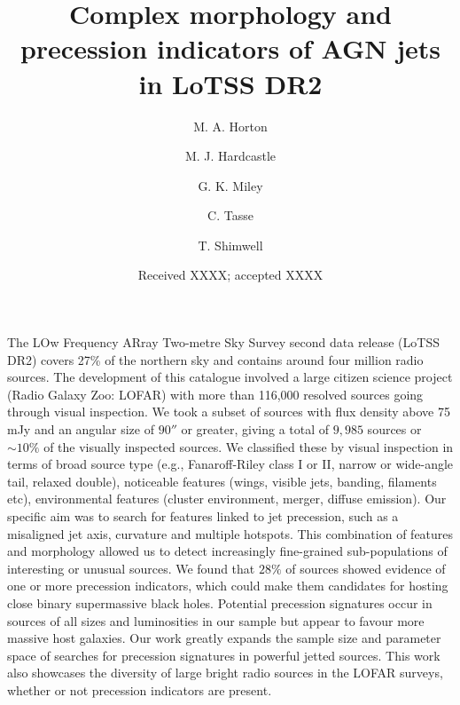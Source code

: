 \documentclass{aa}
\begin{document}
 

\title{Complex morphology and precession indicators of AGN jets in LoTSS DR2}

   \author{M. A. Horton
          \and
          M. J. Hardcastle
          \and
          G. K. Miley
          \and
          C. Tasse
          \and
          T. Shimwell
          }


   \date{Received XXXX; accepted XXXX}

  \abstract
{The LOw Frequency ARray Two-metre Sky Survey second data release (LoTSS DR2) covers 27\% of the northern sky and contains around four million radio sources. The development of this catalogue involved a large citizen science project (Radio Galaxy Zoo: LOFAR) with more than 116,000 resolved sources going through visual inspection. We took a subset of sources with flux density above 75 mJy and an angular size of $90''$ or greater, giving a total of $9,985$ sources or $\sim 10\%$ of the visually inspected sources. We classified these by visual inspection in terms of broad source type (e.g., Fanaroff-Riley class I or II, narrow or wide-angle tail, relaxed double), noticeable features (wings, visible jets, banding, filaments etc), environmental features (cluster environment, merger, diffuse emission). Our specific aim was to search for features linked to jet precession, such as a misaligned jet axis, curvature and multiple hotspots. This combination of features and morphology allowed us to detect increasingly fine-grained sub-populations of interesting or unusual sources. We found that $28\%$ of sources showed evidence of one or more precession indicators, which could make them candidates for hosting close binary supermassive black holes. Potential precession signatures occur in sources of all sizes and luminosities in our sample but appear to favour more massive host galaxies. Our work greatly expands the sample size and parameter space of searches for precession signatures in powerful jetted sources. This work also showcases the diversity of large bright radio sources in the LOFAR surveys, whether or not precession indicators are present.
}
\end{document}
